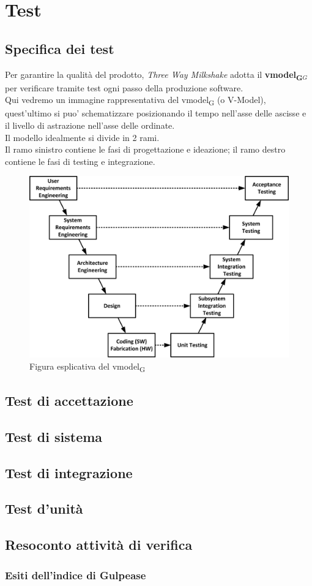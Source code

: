 \section{Test}

\subsection{Specifica dei test}

Per garantire la qualità del prodotto, \textit{Three Way Milkshake} adotta il \textbf{\gls{vmodel}\textsubscript{G}}$_G$ per verificare tramite test ogni passo della produzione software.\\Qui vedremo un immagine rappresentativa del \gls{vmodel}\textsubscript{G} (o V-Model), quest'ultimo si puo' schematizzare posizionando il tempo nell'asse delle ascisse e il livello di astrazione nell'asse delle ordinate.\\Il modello idealmente si divide in 2 rami.\\Il ramo sinistro contiene le fasi di progettazione e ideazione; il ramo destro contiene le fasi di testing e integrazione.
\begin{figure}[h!]
	\centering
	\includegraphics[scale=0.6]{res/images/v_model.jpg}
	\caption{Figura esplicativa del \gls{vmodel}\textsubscript{G}}
\end{figure}

\subsection{Test di accettazione}

\subsection{Test di sistema}

\subsection{Test di integrazione}

\subsection{Test d'unità}

\subsection{Resoconto attività di verifica}
\subsubsection{Esiti dell'indice di Gulpease}
